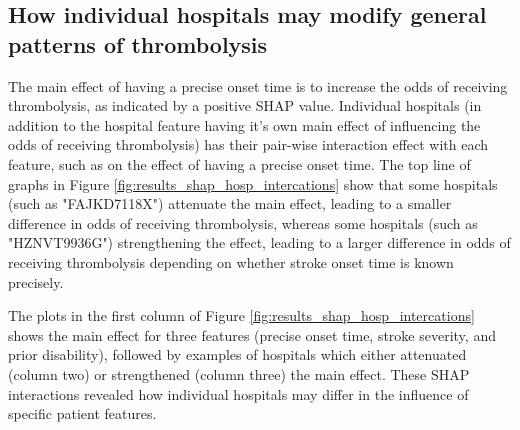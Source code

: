 
\subsection{How individual hospitals may modify general patterns of thrombolysis}

The main effect of having a precise onset time is to increase the odds of receiving thrombolysis, as indicated by a positive SHAP value. Individual hospitals (in addition to the hospital feature having it's own main effect of influencing the odds of receiving thrombolysis) has their pair-wise interaction effect with each feature, such as on the effect of having a precise onset time. The top line of graphs in Figure \ref{fig:results_shap_hosp_intercations} show that some hospitals (such as "FAJKD7118X") attenuate the main effect, leading to a smaller difference in odds of receiving thrombolysis, whereas some hospitals (such as "HZNVT9936G") strengthening the effect, leading to a larger difference in odds of receiving thrombolysis depending on whether stroke onset time is known precisely.

The plots in the first column of Figure \ref{fig:results_shap_hosp_intercations} shows the main effect for three features (precise onset time, stroke severity, and prior disability), followed by examples of hospitals which either attenuated (column two) or strengthened (column three) the main effect. These SHAP interactions revealed how individual hospitals may differ in the influence of specific patient features.


